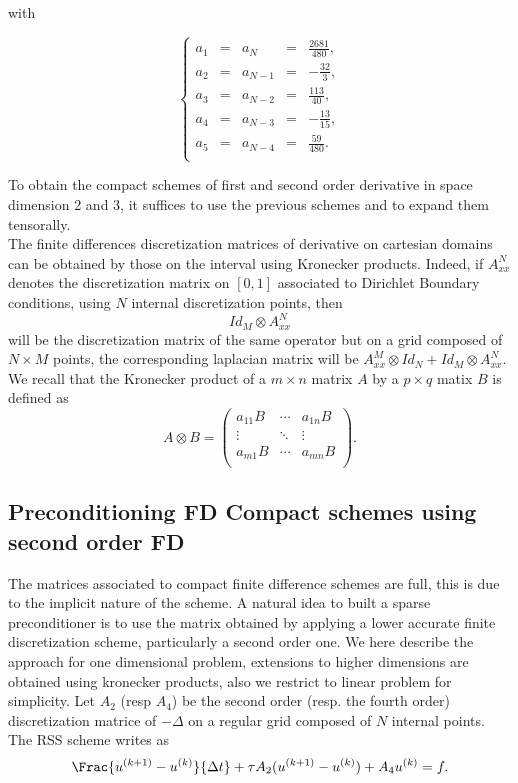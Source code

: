 {with

$$ \left\lbrace \begin{array}{rcccl}
a_1&=&a_{N}&=&\frac{2681}{480},   \\
a_2&=&a_{N-1}&=&-\frac{32}{3},   \\
a_3&=&a_{N-2}&=&\frac{113}{40},   \\
a_4&=&a_{N-3}&=&-\frac{13}{15},   \\
a_5&=&a_{N-4}&=&\frac{59}{480}.   \\
\end{array}  \right.  $$


To obtain the compact schemes of first and second order derivative in space dimension 2 and 3, it suffices to use 
the previous schemes and to expand them tensorally.\\
The finite differences discretization matrices of derivative on cartesian domains can be obtained by those on the interval using Kronecker products. Indeed, if $A^N_{xx}$ denotes the discretization matrix on $[0,1]$ associated to Dirichlet Boundary conditions, using $N$ internal discretization points, then 
$$
Id_M\otimes A^N_{xx}
$$
will be the discretization matrix of the same operator but on a grid composed of $N\times M$ points, the corresponding laplacian matrix will be $A^M_{xx}\otimes Id_N+Id_M\otimes A^N_{xx}$. We recall that the Kronecker product of a $m\times n$ matrix $A$ by a $p\times q$ matix $B$ is defined as
$$
A \otimes B= \begin{pmatrix}
a_{11} B&\cdots &  a_{1n} B \\ 
\vdots& \ddots&\vdots\\
 a_{m1} B&\cdots &  a_{mn} B \\ 
\end{pmatrix}. $$
\subsection{Preconditioning FD Compact schemes using second order FD}
The matrices associated to compact finite difference schemes are full, this is due to the implicit nature of the scheme.
A natural idea to built a sparse preconditioner is to use the matrix obtained by applying a lower accurate finite discretization scheme, particularly a second order one. We here describe the approach for one dimensional problem, extensions to higher dimensions are obtained using kronecker products, also we restrict to linear problem for simplicity. Let $A_2$ (resp $A_4$) be the second order (resp. the fourth order) discretization matrice  of $-\Delta$ on a regular grid composed of $N$ internal points. The RSS scheme writes as
\begin{equation}
\Frac{u^{(k+1)}-u^{(k)}}{\Delta t}+\tau A_2(u^{(k+1)}-u^{(k)})+A_4u^{(k)}=f.
\end{equation}


}
